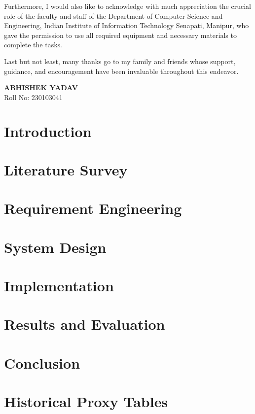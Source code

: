 \documentclass[a4paper, 11pt, oneside]{report}
\begin{document}
	Furthermore, I would also like to acknowledge with much appreciation the crucial role of the faculty and staff of the Department of Computer Science and Engineering, Indian Institute of Information Technology Senapati, Manipur, who gave the permission to use all required equipment and necessary materials to complete the tasks.

	Last but not least, many thanks go to my family and friends whose support, guidance, and encouragement have been invaluable throughout this endeavor.

	\vspace{1cm}
	\begin{flushright}
	    \textbf{ABHISHEK YADAV} \\
	    Roll No: 230103041
	\end{flushright}

	\vspace{1cm}

	{\small\setlength{\parskip}{0pt}\tableofcontents}
	\listoffigures
        \listoftables
	\chapter{Introduction}
	
        \chapter{Literature Survey}
        
        \chapter{Requirement Engineering}
        
        \chapter{System Design}
        
        \chapter{Implementation}
        
        \chapter{Results and Evaluation}
        
        \chapter{Conclusion}
        

        \appendix
        \chapter{Historical Proxy Tables}\label{app:historical}
        

        
	
\end{document}
